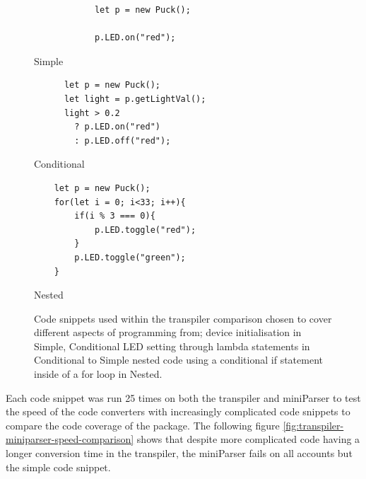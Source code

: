 \documentclass{l4proj}
\begin{document}
\begin{figure}[H]
    \centering
    \begin{minipage}{3.5cm}
        \centering
        \begin{lstlisting}
            let p = new Puck();
        
            p.LED.on("red");
        \end{lstlisting}
        Simple
    \end{minipage}
    \hspace{0.5cm}
    \begin{minipage}{3.5cm}
        \centering
    \begin{lstlisting}
      let p = new Puck();
      let light = p.getLightVal();
      light > 0.2 
        ? p.LED.on("red") 
        : p.LED.off("red");
    \end{lstlisting}
    Conditional
    \end{minipage}
    \hspace{0.5cm}
    \begin{minipage}{4.5cm}
        \centering
        \begin{lstlisting}
    let p = new Puck();
    for(let i = 0; i<33; i++){
        if(i % 3 === 0){
            p.LED.toggle("red");
        }
        p.LED.toggle("green");
    }
    \end{lstlisting}
    Nested
    \end{minipage}
    \caption{Code snippets used within the transpiler comparison chosen to cover different aspects of programming from; device initialisation in Simple, Conditional LED setting through lambda statements in Conditional to Simple nested code using a conditional if statement inside of a for loop in Nested.}
    \label{fig:transpiler_code_snippets}
\end{figure}

    

    

Each code snippet was run 25 times on both the transpiler and miniParser to test the speed of the code converters with increasingly complicated code snippets to compare the code coverage of the package. The following figure \ref{fig:transpiler-miniparser-speed-comparison} shows that despite more complicated code having a longer conversion time in the transpiler, the miniParser fails on all accounts but the simple code snippet.
\end{document}

